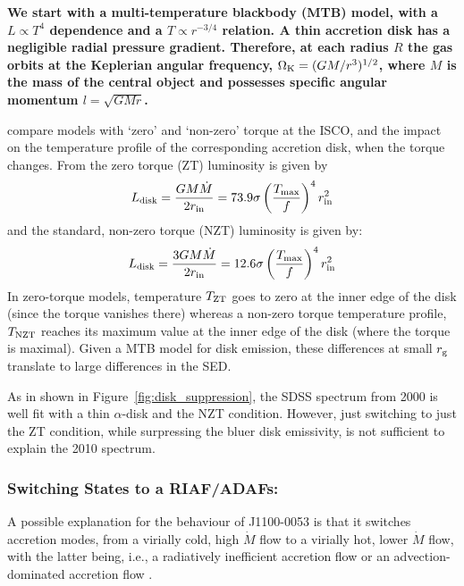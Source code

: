\documentclass[a4paper,fleqn,usenatbib]{mnras}
\begin{document}
{\bf 
We start with a multi-temperature blackbody (MTB) model, with a $L
\propto T^4$ dependence and a $T \propto r^{-3/4}$ relation. A thin
accretion disk has a negligible radial pressure gradient. Therefore,
at each radius $R$ the gas orbits at the Keplerian angular frequency,
$\Omega_{\rm K} = (GM/r^{3})^{1/2}$, where $M$ is the mass of the
central object and possesses specific angular momentum $l= \sqrt{GMr}$. 

\citet{Zimmerman2005} compare models with `zero' and `non-zero' torque
at the ISCO, and the impact on the temperature profile of the
corresponding accretion disk, when the torque changes.  From
\citet{Zimmerman2005} the zero torque (ZT) luminosity is given by
\begin{equation}
L_{\rm disk}   =  \frac{G M \dot{M}}  {2 r_{\rm in}}    = 73.9 \sigma\left ( \frac{T_{\rm max}}{f}  \right )^{4}  r^{2}_{\rm in} 
\end{equation}
and the standard, non-zero torque (NZT) luminosity is given by:
\begin{equation}
L_{\rm disk} = \frac{3 G M \dot{M}}  {2 r_{\rm in}}    = 12.6 \sigma\left ( \frac{T_{\rm max}}{f}  \right )^{4}  r^{2}_{\rm in} 
\end{equation} 
In zero-torque models, temperature $T_{\rm ZT}$ goes to zero at the
inner edge of the disk (since the torque vanishes there) whereas a
non-zero torque temperature profile, $T_{\rm NZT}$ reaches its maximum
value at the inner edge of the disk (where the torque is maximal).
Given a MTB model for disk emission, these differences at small
$r_{\rm g}$ translate to large differences in the SED.

As in shown in Figure~\ref{fig:disk_suppression}, the SDSS spectrum
from 2000 is well fit with a thin \citet{SS73} $\alpha$-disk and the
NZT condition.  However, just switching to just the ZT condition,
while surpressing the bluer disk emissivity, is not sufficient to
explain the 2010 spectrum.

\subsubsection{Switching States to a RIAF/ADAFs:}
A possible explanation for the behaviour of J1100-0053 is that it
switches accretion modes, from a virially cold, high $\dot{M}$ flow to a
virially hot, lower $\dot{M}$ flow, with the latter being, i.e., a
radiatively inefficient accretion flow \citep[RIAF; ][]{Narayan1998,
Quataert2001} or an advection-dominated accretion flow \citep[ADAF;
][and references therein]{YuanNarayan2014}.

}
\end{document}

